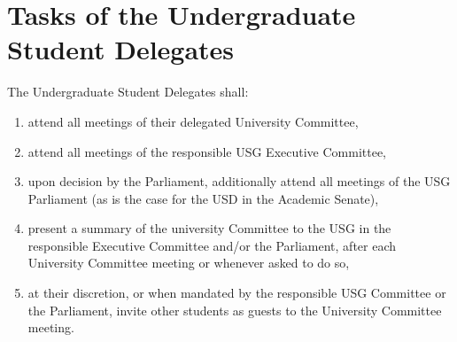 \section{Tasks of the Undergraduate Student Delegates}
The Undergraduate Student Delegates shall:
\begin{enumerate}
    \item attend all meetings of their delegated University Committee,
    \item attend all meetings of the responsible USG Executive Committee,
    \item upon decision by the Parliament, additionally attend all meetings of the USG Parliament (as is the case for the USD in the Academic Senate),
    \item present a summary of the university Committee to the USG in the responsible Executive Committee and/or the Parliament, after each University Committee meeting or whenever asked to do so,
    \item at their discretion, or when mandated by the responsible USG Committee or the Parliament, invite other students as guests to the University Committee meeting.
\end{enumerate}